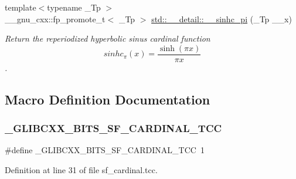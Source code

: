 \begin{DoxyCompactItemize}
{\footnotesize template$<$typename \+\_\+\+Tp $>$ }\\\+\_\+\+\_\+gnu\+\_\+cxx\+::fp\+\_\+promote\+\_\+t$<$ \+\_\+\+Tp $>$ \hyperlink{namespacestd_1_1____detail_a3478d06aa615f1efb0fd86fd4eb59195}{std\+::\+\_\+\+\_\+detail\+::\+\_\+\+\_\+sinhc\+\_\+pi} (\+\_\+\+Tp \+\_\+\+\_\+x)
\begin{DoxyCompactList}\small\item\em Return the reperiodized hyperbolic sinus cardinal function \[ sinhc_\pi(x) = \frac{\sinh(\pi x)}{\pi x} \]. \end{DoxyCompactList}\end{DoxyCompactItemize}


\subsection{Macro Definition Documentation}
\mbox{\label{sf__cardinal_8tcc_a1e9bb8201f62b2303ba941ea920790b6}} 
\subsubsection{\texorpdfstring{\+\_\+\+G\+L\+I\+B\+C\+X\+X\+\_\+\+B\+I\+T\+S\+\_\+\+S\+F\+\_\+\+C\+A\+R\+D\+I\+N\+A\+L\+\_\+\+T\+CC}{\_GLIBCXX\_BITS\_SF\_CARDINAL\_TCC}}
{\footnotesize\ttfamily \#define \+\_\+\+G\+L\+I\+B\+C\+X\+X\+\_\+\+B\+I\+T\+S\+\_\+\+S\+F\+\_\+\+C\+A\+R\+D\+I\+N\+A\+L\+\_\+\+T\+CC~1}



Definition at line 31 of file sf\+\_\+cardinal.\+tcc.


